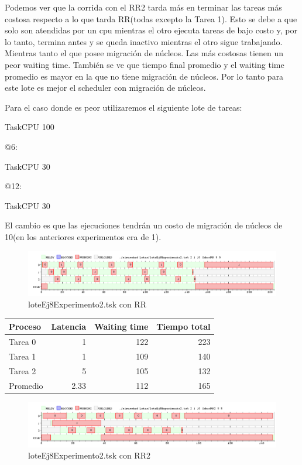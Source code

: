 Podemos ver que la corrida con el RR2 tarda más en terminar las tareas más costosa respecto a lo que tarda RR(todas excepto la Tarea 1). Esto se debe a que solo son atendidas 
por un cpu mientras el otro ejecuta tareas de bajo costo y, por lo tanto, termina antes y se queda inactivo mientras el otro sigue trabajando. Mientras tanto el que posee 
migración de núcleos. 
Las más costosas tienen un peor waiting time. También se ve que tiempo final promedio y el waiting time promedio es mayor en la que no tiene migración de núcleos. Por
lo tanto para este lote es mejor el scheduler con migración de núcleos. 

Para el caso donde es peor utilizaremos el siguiente lote de tareas:

TaskCPU 100

@6:

TaskCPU 30

@12:

TaskCPU 30

El cambio es que las ejecuciones tendrán un costo de migración de núcleos de 10(en los anteriores experimentos era de 1).

\begin{figure}[H]
  \centering
    \includegraphics[width=1.1\textwidth]{imagenes/Ej8Experimento3.png}
  \caption{loteEj8Experimento2.tsk con RR}
\end{figure}

\begin{tabular}{l | r | r | r }
  Proceso & Latencia & Waiting time & Tiempo total\\
  \hline
  Tarea 0 & 1 & 122 &  223\\
  Tarea 1 & 1 & 109 &  140\\
  Tarea 2 & 5 & 105 & 132 \\
  Promedio & 2.33 & 112 & 165 \\
\end{tabular}

\begin{figure}[H]
  \centering
    \includegraphics[width=1.1\textwidth]{imagenes/Ej8Experimento4.png}
  \caption{loteEj8Experimento2.tsk con RR2}
\end{figure}

